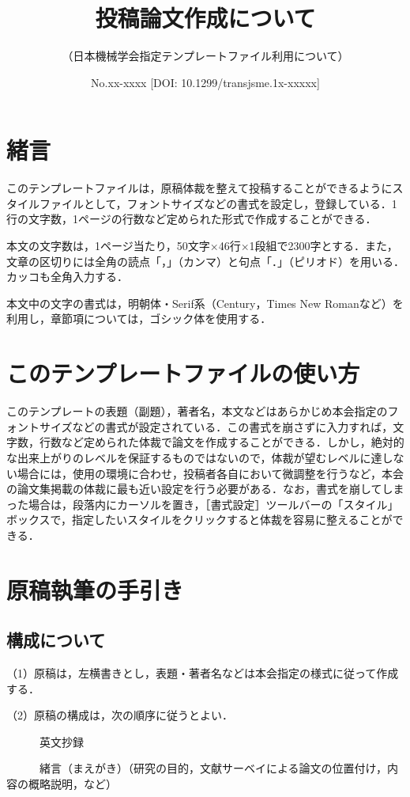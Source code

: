 \documentclass[a4jsme, fleqn]{jsmepaper}
\title{投稿論文作成について}
\subtitle{（日本機械学会指定テンプレートファイル利用について）}
\date{No.xx-xxxx [DOI: 10.1299/transjsme.1x-xxxxx]}
\begin{document}
\maketitle
\thispagestyle{empty}
%
%
\section{緒言}

このテンプレートファイルは，原稿体裁を整えて投稿することができるようにスタイルファイルとして，フォントサイズなどの書式を設定し，登録している．1行の文字数，1ページの行数など定められた形式で作成することができる．

本文の文字数は，1ページ当たり，50文字×46行×1段組で2300字とする．また，文章の区切りには全角の読点「，」（カンマ）と句点「．」（ピリオド）を用いる．カッコも全角入力する．

本文中の文字の書式は，明朝体・Serif系（Century，Times New Romanなど）を利用し，章節項については，ゴシック体を使用する．

\section{このテンプレートファイルの使い方}

このテンプレートの表題（副題），著者名，本文などはあらかじめ本会指定のフォントサイズなどの書式が設定されている．この書式を崩さずに入力すれば，文字数，行数など定められた体裁で論文を作成することができる．しかし，絶対的な出来上がりのレベルを保証するものではないので，体裁が望むレベルに達しない場合には，使用の環境に合わせ，投稿者各自において微調整を行うなど，本会の論文集掲載の体裁に最も近い設定を行う必要がある．なお，書式を崩してしまった場合は，段落内にカーソルを置き，［書式設定］ツールバーの「スタイル」ボックスで，指定したいスタイルをクリックすると体裁を容易に整えることができる．

\section{原稿執筆の手引き}
\subsection{構成について}
（1）原稿は，左横書きとし，表題・著者名などは本会指定の様式に従って作成する．

（2）原稿の構成は，次の順序に従うとよい．

　　　英文抄録

　　　緒言（まえがき）（研究の目的，文献サーベイによる論文の位置付け，内容の概略説明，など）
\end{document}
